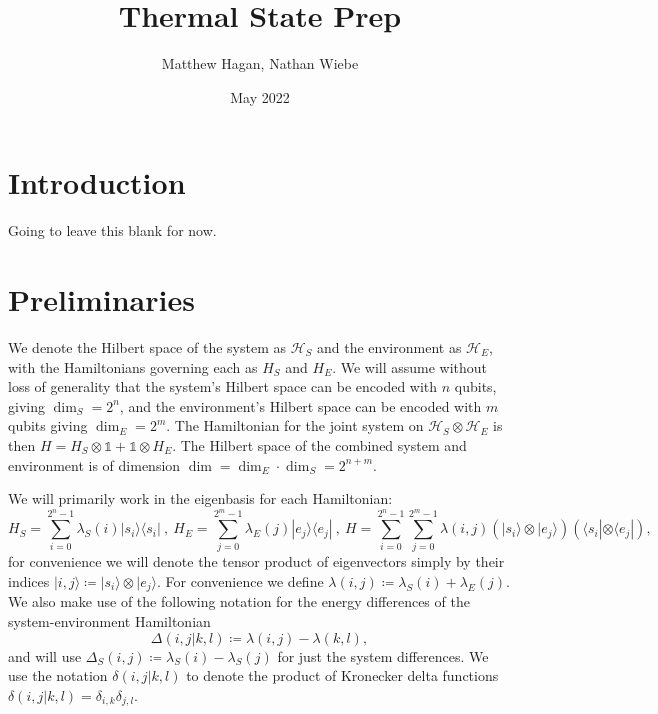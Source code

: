 \documentclass{article}
\title{Thermal State Prep}
\author{Matthew Hagan, Nathan Wiebe}
\date{May 2022}
\newcommand{\ket}[1]{|#1\rangle}
\newcommand{\bra}[1]{\langle #1|}
\newcommand{\ketbra}[2]{| #1\rangle\! \langle #2|}
\newcommand{\hilb}{\mathcal{H}}
\newcommand{\identity}{\mathds{1}}
\begin{document}
\maketitle

\tableofcontents

\section{Introduction}
Going to leave this blank for now. \cite{shiraishi_undecidability_2021}

\section{Preliminaries}
We denote the Hilbert space of the system as $\hilb_{S}$ and the environment as $\hilb_{E}$, with the Hamiltonians governing each as $H_{S}$ and $H_{E}$. We will assume without loss of generality that the system's Hilbert space can be encoded with $n$ qubits, giving $\dim_S = 2^{n}$, and the environment's Hilbert space can be encoded with $m$ qubits giving $\dim_E = 2^{m}$. The Hamiltonian for the joint system on $\hilb_{S} \otimes \hilb_{E}$ is then $H = H_{S} \otimes \identity + \identity \otimes H_{E}$. The Hilbert space of the combined system and environment is of dimension $\dim = \dim_E \cdot \dim_S = 2^{n + m}$. 

We will primarily work in the eigenbasis for each Hamiltonian:
\begin{equation}
    H_{S} = \sum_{i = 0}^{2^n - 1} \lambda_S(i) \ketbra{s_i}{s_i} ~,~ H_{E} = \sum_{j=0}^{2^m - 1} \lambda_E(j) \ketbra{e_j}{e_j} ~,~ H = \sum_{i=0}^{2^n - 1} \sum_{j=0}^{2^m - 1} \lambda(i,j) (\ket{s_i} \otimes \ket{e_j})(\bra{s_i} \otimes \bra{e_j}),
\end{equation}
for convenience we will denote the tensor product of eigenvectors simply by their indices $\ket{i,j} \coloneqq \ket{s_i} \otimes \ket{e_j}$. For convenience we define $\lambda(i,j) \coloneqq \lambda_S(i) + \lambda_E(j)$. We also make use of the following notation for the energy differences of the system-environment Hamiltonian
$$\Delta(i,j|k,l) \coloneqq \lambda(i,j) - \lambda(k,l),$$
and will use $\Delta_S(i,j) \coloneqq \lambda_S(i) - \lambda_S(j)$ for just the system differences. We use the notation $\delta(i,j|k,l)$ to denote the product of Kronecker delta functions $\delta(i,j|k,l) = \delta_{i,k} \delta_{j,l}$.
\end{document}
